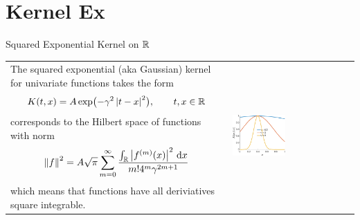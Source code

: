 \documentclass[10pt,compress,xcolor={usenames,dvipsnames},aspectratio=169]{beamer}
\begin{document}
\section{Kernel Ex}
\begin{frame}{Squared Exponential Kernel on $\mathbb{R}$}
	
	\vspace{-8ex}
\begin{tabular}{m{}m{}}
	The squared exponential (aka Gaussian) kernel for univariate functions takes the form 
	\[
	K(t,x) = A \exp\bigl(-\gamma^2\left \lvert t-x \right \rvert^2 \bigr) , \qquad t, x \in \mathbb{R}
	\]
corresponds to the Hilbert space of functions with norm \cite[(6.18)]{RasWil06a}
\begin{equation*}
\left \lVert f \right \rVert_{{}}^2 = A\sqrt{\pi} \sum_{m=0}^\infty\frac{\int_{\mathbb{R}} \left \lvert f^{(m)}(x) \right \rvert^2 \, {\rm d} x}{m! 4^m \gamma^{2m+1}}
\end{equation*}
which means that functions  have all deriviatives square integrable.
&
\includegraphics[width=0.45\textwidth]{RK-sqexpker.eps}
\end{tabular}
\end{frame}
\end{document}
